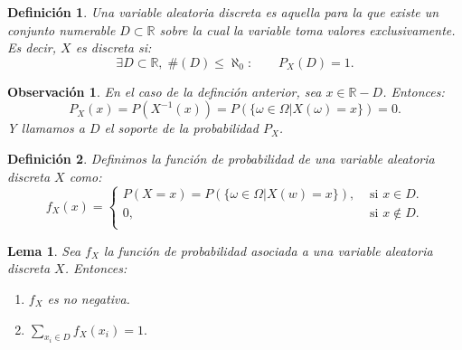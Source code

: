 \documentclass{report}
\newtheorem{lem}{Lema}[section]
\newtheorem{dfn}{Definición}[section]
\newtheorem{obs}{Observación}[section]
\begin{document}
\begin{dfn}
Una \emph{variable aleatoria discreta} es aquella para la que existe un conjunto numerable $D\subset \mathbb{R}$ sobre la cual
la variable toma valores exclusivamente. Es decir, $X$ es discreta si:
\begin{equation*}
    \exists D\subset\mathbb{R}, \; \#(D)\leq \aleph_0 : \qquad P_X(D)=1.
\end{equation*}
\end{dfn}

\begin{obs}
    En el caso de la definción anterior, sea $x\in \mathbb{R}-D$. Entonces:
    \begin{equation*}
    P_X(x) = P(X^{-1}(x))=P\left( \{\omega \in \Omega | X(\omega)=x \} \right) = 0.
    \end{equation*}
    Y llamamos a $D$ el \emph{soporte} de la probabilidad $P_X$.
\end{obs}

\begin{dfn}
    Definimos la función de probabilidad de una variable aleatoria discreta $X$ como:
    \begin{equation*}
        f_X(x)=\begin{cases}
            P(X=x) = P\left( \{\omega \in \Omega | X(w)=x \} \right), &\text{ si } x\in D.\\
            0, &\text{ si } x\notin D.\\
        \end{cases}
    \end{equation*}
\end{dfn}

\begin{lem}
    Sea $f_X$ la función de probabilidad asociada a una variable aleatoria discreta $X$. Entonces:
    \begin{enumerate}
        \item $f_X$ es no negativa.
        \item $\displaystyle\sum_{x_i\in D} f_X(x_i) = 1.$
    \end{enumerate}
\end{lem}

\end{document}
